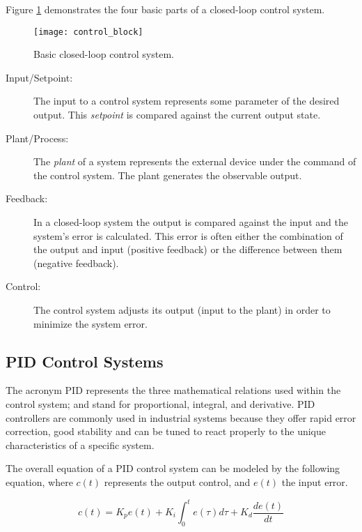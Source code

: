 \documentclass[openany,11pt,fleqn]{book} %
\begin{document}
Figure \ref{control_block} demonstrates the four basic parts of a closed-loop control system. 

\begin{figure}[tb]
    \centering\texttt{[image: control\_block]}
    \caption{Basic closed-loop control system.}
    \label{control_block}
\end{figure}

\begin{description}
    \item [Input/Setpoint:] The input to a control system represents some parameter of the desired output. This \textit{setpoint} is compared against the current output state. 
    \item [Plant/Process:] The \textit{plant} of a system represents the external device under the command of the control system. The plant generates the observable output.
    \item [Feedback:] In a closed-loop system the output is compared against the input and the system's error is calculated. This error is often either the combination of the output and input (positive feedback) or the difference between them (negative feedback).
    \item [Control:] The control system adjusts its output (input to the plant) in order to minimize the system error. 
\end{description}

\subsection{\color{orange}PID Control Systems}
The acronym PID represents the three mathematical relations used within the control system; and stand for proportional, integral, and derivative. PID controllers are commonly used in industrial systems because they offer rapid error correction, good stability and can be tuned to react properly to the unique characteristics of a specific system.

The overall equation of a PID control system can be modeled by the following equation, where $c(t)$ represents the output control, and $e(t)$ the input error. 

    \begin{equation*}
    c(t) = K_{p}e(t) + K_{i}\int_{0}^{t}e(\tau)d\tau + K_{d}\frac{de(t)}{dt}
    \end{equation*} 
\end{document}
